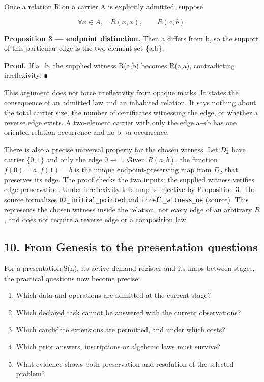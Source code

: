 \documentclass[
  11pt,
]{article}
\providecommand{\tightlist}{%
  \setlength{\itemsep}{0pt}\setlength{\parskip}{0pt}}
\begin{document}
Once a relation R on a carrier A is explicitly admitted, suppose

\[
\forall x\in A,\;\neg R(x,x),\qquad R(a,b).
\]

\textbf{Proposition 3 --- endpoint distinction.} Then a differs from b,
so the support of this particular edge is the two-element set \{a,b\}.

\textbf{Proof.} If a=b, the supplied witness R(a,b) becomes R(a,a),
contradicting irreflexivity. ∎

This argument does not force irreflexivity from opaque marks. It states
the consequence of an admitted law and an inhabited relation. It says
nothing about the total carrier size, the number of certificates
witnessing the edge, or whether a reverse edge exists. A two-element
carrier with only the edge a→b has one oriented relation occurrence and
no b→a occurrence.

There is also a precise universal property for the chosen witness. Let
\(D_2\) have carrier \(\{0,1\}\) and only the edge \(0\to1\). Given
\(R(a,b)\), the function \(f(0)=a, f(1)=b\) is the unique
endpoint-preserving map from \(D_2\) that preserves its edge. The proof
checks the two inputs; the supplied witness verifies edge preservation.
Under irreflexivity this map is injective by Proposition 3. The source
formalizes \nolinkurl{D2_initial_pointed} and
\nolinkurl{irrefl_witness_ne}
(\href{lean4/Derivation/PrimDiff.lean\#L120}{source}). This represents
the chosen witness inside the relation, not every edge of an arbitrary
\(R\), and does not require a reverse edge or a composition law.

\subsection{10. From Genesis to the presentation
questions}\label{from-genesis-to-the-presentation-questions}

For a presentation S(n), its active demand register and its maps between
stages, the practical questions now become precise:

\begin{enumerate}
\def\labelenumi{\arabic{enumi}.}
\tightlist
\item
  Which data and operations are admitted at the current stage?
\item
  Which declared task cannot be answered with the current observations?
\item
  Which candidate extensions are permitted, and under which costs?
\item
  Which prior answers, inscriptions or algebraic laws must survive?
\item
  What evidence shows both preservation and resolution of the selected
  problem?
\end{enumerate}
\end{document}

